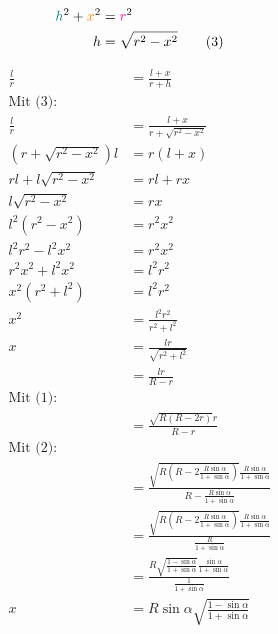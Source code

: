 \begin{align*}
	\textcolor{teal}{h}^2 + \textcolor{orange}{x}^2 &= \textcolor{magenta}{r}^2 \\
	h &= \sqrt{r^2-x^2} \tag{3}
\end{align*}

\begin{samepage}
	\begin{align*}
		\frac{l}{r} &= \frac{l+x}{r+h} \\
		\text{Mit (3):} \\
		\frac{l}{r} &= \frac{l+x}{r+\sqrt{r^2-x^2}} \\
		(r+\sqrt{r^2-x^2})l &= r(l+x) \\
		rl + l\sqrt{r^2-x^2} &= rl+rx \\
		l\sqrt{r^2-x^2} &= rx \\
		l^2(r^2-x^2) &= r^2 x^2 \\
		l^2 r^2 - l^2 x^2 &= r^2 x^2 \\
		r^2 x^2 + l^2 x^2 &= l^2 r^2 \\
		x^2 (r^2+l^2) &= l^2 r^2 \\
		x^2 &= \frac{l^2 r^2}{r^2 + l^2} \\
		x &= \frac{lr}{\sqrt{r^2+l^2}} \\
		&= \frac{lr}{R-r} \\
		\text{Mit (1):} \\
		&= \frac{\sqrt{R(R-2r)}r}{R-r} \\
		\text{Mit (2):} \\
		&= \frac{\sqrt{R(R-2\frac{R\sin\alpha}{1+\sin\alpha})}\frac{R\sin\alpha}{1+\sin\alpha}}{R-\frac{R\sin\alpha}{1+\sin\alpha}} \\
		&= \frac{\sqrt{R(R-2\frac{R\sin\alpha}{1+\sin\alpha})}\frac{R\sin\alpha}{1+\sin\alpha}}{\frac{R}{1+\sin\alpha}} \\
		&= \frac{R\sqrt{\frac{1-\sin\alpha}{1+\sin\alpha}}\frac{\sin\alpha}{1+\sin\alpha}}{\frac{1}{1+\sin\alpha}} \\
		x &= R\sin\alpha\sqrt{\frac{1-\sin\alpha}{1+\sin\alpha}} \tag{4}
	\end{align*}
\end{samepage}
\goodbreak
